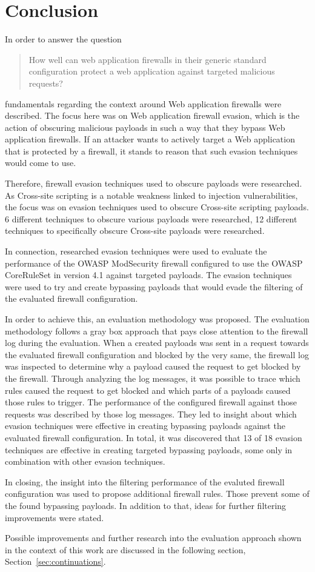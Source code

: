 \section{Conclusion}
\label{sec:conclusion}
In order to answer the question
\begin{quote}
	How well can web application firewalls in their generic standard configuration
	protect a web application against targeted malicious requests?
\end{quote}
fundamentals regarding the context around Web application firewalls were described.
The focus here was on Web application firewall evasion, which is the action of obscuring malicious payloads in such a way that they bypass Web application firewalls.
If an attacker wants to actively target a Web application that is protected by a firewall, it stands to reason that such evasion techniques would come to use. 

Therefore, firewall evasion techniques used to obscure payloads were researched.
As Cross-site scripting is a notable weakness linked to injection vulnerabilities, the focus was on evasion techniques used to obscure Cross-site scripting payloads.
6 different techniques to obscure various payloads were researched, 12 different techniques to specifically obscure Cross-site payloads were researched. 

In connection, researched evasion techniques were used to evaluate the performance of the OWASP ModSecurity firewall configured to use the OWASP CoreRuleSet in version 4.1 against targeted payloads. 
The evasion techniques were used to try and create bypassing payloads that would evade the filtering of the evaluated firewall configuration. 

In order to achieve this, an evaluation methodology was proposed. 
The evaluation methodology follows a gray box approach that pays close attention to the firewall log during the evaluation.
When a created payloads was sent in a request towards the evaluated firewall configuration and blocked by the very same, the firewall log was inspected to determine why a payload caused the request to get blocked by the firewall. 
Through analyzing the log messages, it was possible to trace which rules caused the request to get blocked and which parts of a payloads caused those rules to trigger. 
The performance of the configured firewall against those requests was described by those log messages. They led to insight about which evasion techniques were effective in creating bypassing payloads against the evaluated firewall configuration. In total, it was discovered that 13 of 18 evasion techniques are effective in creating targeted bypassing payloads, some only in combination with other evasion techniques. 

In closing, the insight into the filtering performance of the evaluted firewall configuration was used to propose additional firewall rules. Those prevent some of the found bypassing payloads. In addition to that, ideas for further filtering improvements were stated.

Possible improvements and further research into the evaluation approach shown in the context of this work are discussed in the following section, Section~\ref{sec:continuations}.



